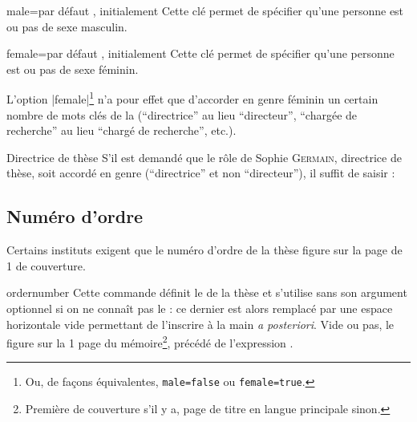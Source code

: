 \begin{docKey}{male}{=\textbar{}}{par défaut
    , initialement }
  Cette clé permet de spécifier qu'une personne est ou pas de sexe masculin.
\end{docKey}

\begin{docKey}{female}{=\textbar{}}{par défaut
    , initialement }
  Cette clé permet de spécifier qu'une personne est ou pas de sexe féminin.
\end{docKey}

L'option |female|\footnote{Ou, de façons équivalentes,
  \protect\lstinline+male=false+ ou \protect\lstinline+female=true+.} n'a pour
effet que d'accorder en genre féminin un certain nombre de mots clés de la
\yatCl{} (\enquote{directrice} au lieu \enquote{directeur}, \enquote{chargée de
  recherche} au lieu \enquote{chargé de recherche}, etc.).

\begin{dbexample}{Directrice de thèse}{}
  S'il est demandé que le rôle de Sophie \textsc{Germain}, directrice de thèse,
  soit accordé en genre (\enquote{directrice} et non \enquote{directeur}), il
  suffit de saisir :
\begin{preamblecode}[listing options={deletekeywords={[5]supervisor}}]
\end{preamblecode}
\end{dbexample}

\subsection{Numéro d'ordre}
\label{sec-numero-dordre}

Certains instituts exigent que le numéro d'ordre de la thèse figure sur la page
de 1\iere{} de couverture.

\begin{docCommand}{ordernumber}{}
  Cette commande définit le  de la thèse et s'utilise sans
  son argument optionnel si on ne connaît pas  le  : ce dernier est alors remplacé par une espace horizontale vide
  permettant de l'inscrire à la main \emph{a posteriori}. Vide ou pas, le
   figure sur  la 1\iere{} page du
  mémoire\footnote{Première de couverture s'il y a, page de titre en langue
    principale sinon.}, précédé de l'expression
  .
\end{docCommand}

